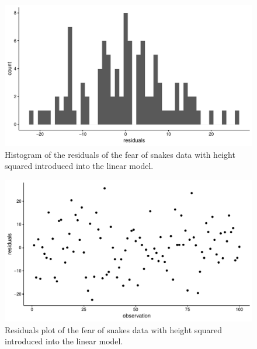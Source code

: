 \documentclass[]{book}\usepackage[]{graphicx}\usepackage[]{color}
\makeatletter
\def\maxwidth{ %
  \ifdim\Gin@nat@width>\linewidth
    \linewidth
  \else
    \Gin@nat@width
  \fi
}
\newenvironment{knitrout}{}{} %
\makeatother
\begin{document}
\begin{knitrout}
\color{fgcolor}\begin{figure}

{\centering \includegraphics[width=\maxwidth]{figure/ass_14-1} 

}

\caption[Histogram of the residuals of the fear of snakes data with height squared introduced into the linear model]{Histogram of the residuals of the fear of snakes data with height squared introduced into the linear model.}\label{fig:ass_14}
\end{figure}


\end{knitrout}

\begin{knitrout}
\color{fgcolor}\begin{figure}

{\centering \includegraphics[width=\maxwidth]{figure/ass_15-1} 

}

\caption[Residuals plot of the fear of snakes data with height squared introduced into the linear model]{Residuals plot of the fear of snakes data with height squared introduced into the linear model. }\label{fig:ass_15}
\end{figure}


\end{knitrout}
\end{document}
